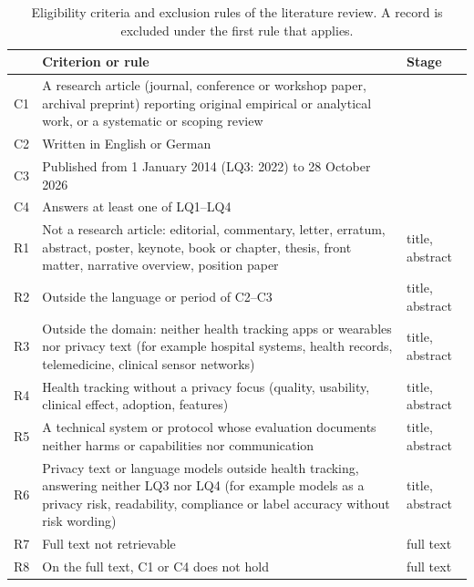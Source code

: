 \begin{table}[tbp]
\centering
\begin{singlespace}
\caption[Eligibility criteria and exclusion rules of the literature
review]{Eligibility criteria and exclusion rules of the literature review. A
record is excluded under the first rule that applies.}
\label{tab:lit-criteria}
\small
\begin{tabularx}{\textwidth}{@{}l>{\raggedright\arraybackslash}X>{\raggedright\arraybackslash}p{2.0cm}@{}}
\toprule
 & \textbf{Criterion or rule} & \textbf{Stage} \\
\midrule
C1 & A research article (journal, conference or workshop paper, archival preprint) reporting original empirical or analytical work, or a systematic or scoping review & \\
C2 & Written in English or German & \\
C3 & Published from 1 January 2014 (LQ3: 2022) to 28 October 2026 & \\
C4 & Answers at least one of LQ1--LQ4 & \\
\midrule
R1 & Not a research article: editorial, commentary, letter, erratum, abstract, poster, keynote, book or chapter, thesis, front matter, narrative overview, position paper & title, abstract \\
R2 & Outside the language or period of C2--C3 & title, abstract \\
R3 & Outside the domain: neither health tracking apps or wearables nor privacy text (for example hospital systems, health records, telemedicine, clinical sensor networks) & title, abstract \\
R4 & Health tracking without a privacy focus (quality, usability, clinical effect, adoption, features) & title, abstract \\
R5 & A technical system or protocol whose evaluation documents neither harms or capabilities nor communication & title, abstract \\
R6 & Privacy text or language models outside health tracking, answering neither LQ3 nor LQ4 (for example models as a privacy risk, readability, compliance or label accuracy without risk wording) & title, abstract \\
R7 & Full text not retrievable & full text \\
R8 & On the full text, C1 or C4 does not hold & full text \\
\bottomrule
\end{tabularx}
\end{singlespace}
\end{table}


